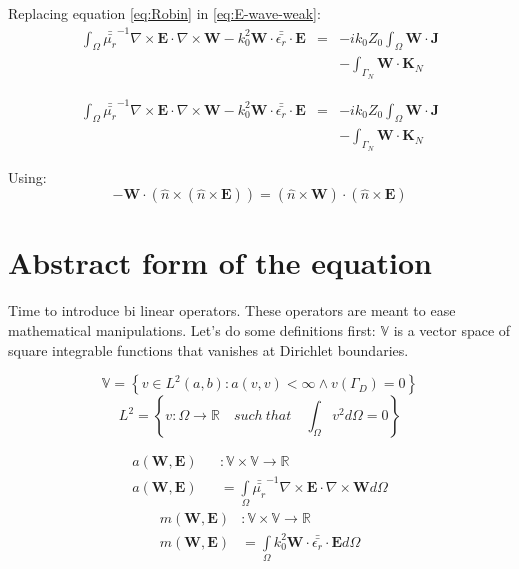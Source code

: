 Replacing equation \ref{eq:Robin} in \ref{eq:E-wave-weak}:
\begin{equation}
\begin{array}{rcl}
\int_{\Omega} \bar{\bar{\mu_r}}^{-1}\nabla\times \mathbf{E}\cdot \nabla\times\mathbf{W}
-k_0^{2}\mathbf{W}\cdot \bar{\bar{\epsilon_r}}\cdot \mathbf{E}
&=& -ik_0Z_0 \int_{\Omega} \mathbf{W}\cdot\mathbf{J}  \\
&&- \int_{\Gamma_N} \mathbf{W} \cdot\mathbf{K}_N
\end{array}
\end{equation}

\begin{equation}
\begin{array}{rcl}
\int_{\Omega} \bar{\bar{\mu_r}}^{-1}\nabla\times \mathbf{E}\cdot \nabla\times\mathbf{W}
-k_0^{2}\mathbf{W}\cdot \bar{\bar{\epsilon_r}}\cdot \mathbf{E}
&=& -ik_0Z_0 \int_{\Omega} \mathbf{W}\cdot\mathbf{J} \label{eq:E-wave-weak_3} \\
&&- \int_{\Gamma_N} \mathbf{W} \cdot\mathbf{K}_N 
\end{array}
\end{equation}

Using:
$$-\mathbf{W}\cdot\left(\hat{n}\times \left( \hat{n}\times 
\mathbf{E} \right)\right)  = \left(\hat{n}\times \mathbf{W}\right)\cdot\left( \hat{n}\times 
\mathbf{E} \right) $$


\section{Abstract form of the equation}

Time to introduce bi linear operators. These operators are meant to ease mathematical manipulations. Let's do some definitions first:
$\mathbb{V}$ is a vector space of square integrable functions that vanishes at Dirichlet boundaries.

$$ \mathbb{V}=\left\lbrace v\in L^2(a,b):a(v,v)<\infty\wedge v(\Gamma_D)=0\right\rbrace$$
$$L^2 =\left\lbrace v: \Omega \rightarrow \mathbb{R}\quad such \ that\quad \int_{\Omega}v^2d\Omega =0\right\rbrace$$ 

\begin{equation}
\begin{array}{rcl}
      a(\mathbf{W},\mathbf{E})&&:\mathbb{V}\times \mathbb{V}\rightarrow \mathbb{R}\\
      a(\mathbf{W},\mathbf{E})&&= \int\limits_{\Omega}  \bar{\bar{\mu_r}}^{-1}\nabla\times \mathbf{E}\cdot \nabla\times\mathbf{W} d\Omega
\label{eq:a_def}
\end{array}
\end{equation}
\begin{equation}
\begin{array}{rcl}
      m(\mathbf{W},\mathbf{E})&:\mathbb{V}\times \mathbb{V}\rightarrow \mathbb{R}\\
      m(\mathbf{W},\mathbf{E})&= \int\limits_{\Omega} k_0^{2}\mathbf{W}\cdot \bar{\bar{\epsilon_r}}\cdot \mathbf{E} d\Omega
\label{eq:m_def}
\end{array}
\end{equation}

